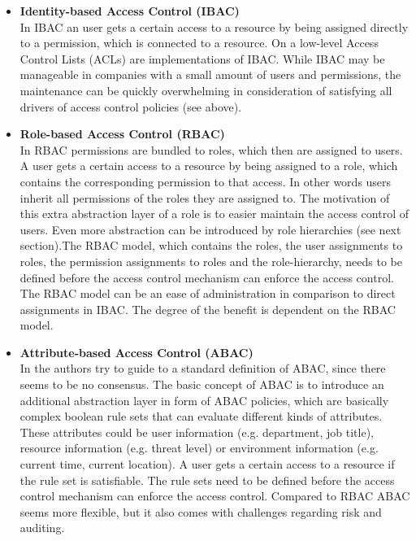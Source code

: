         \iffalse There is no consensus on the terms access control models, mechanisms and techniques. In this thesis an access control policy model describes a policy framework that specifies how permissions are managed and who, under what circumstances, is entitled to which permission on a high-level. There are different Access Control Policy Models which come with different advantages and disadvantages. Some of these models are briefly described in the following to enable the reader to differentiate between the concepts. \fi
        \begin{itemize}
            \iffalse \item \textbf{Discretionary Access Control (DAC)}\\\fi
            \item \textbf{Identity-based Access Control (IBAC)}\\
            In IBAC an user gets a certain access to a resource by being assigned directly to a permission, which is connected to a resource. On a low-level Access Control Lists (ACLs) are implementations of IBAC. While IBAC may be manageable in companies with a small amount of users and permissions, the maintenance can be quickly overwhelming in consideration of satisfying all drivers of access control policies (see above).
            \item \textbf{Role-based Access Control (RBAC)}\\
            In RBAC permissions are bundled to roles, which then are assigned to users. A user gets a certain access to a resource by being assigned to a role, which contains the corresponding permission to that access. In other words users inherit all permissions of the roles they are assigned to. The motivation of this extra abstraction layer of a role is to easier maintain the access control of users.
            Even more abstraction can be introduced by role hierarchies (see next section).\iffalse , where a role inherits all permissions of its parent-role.\fi The RBAC model, which contains the roles, the user assignments to roles, the permission assignments to roles and the role-hierarchy, needs to be defined before the access control mechanism can enforce the access control. The RBAC model can be an ease of administration in comparison to direct assignments in IBAC. The degree of the benefit is dependent on the RBAC model.
            \item \textbf{Attribute-based Access Control (ABAC)}\\
            In \cite{Hu13guideto} the authors try to guide to a standard definition of ABAC, since there seems to be no consensus. The basic concept of ABAC is to introduce an additional abstraction layer in form of ABAC policies, which are basically complex boolean rule sets that can evaluate different kinds of attributes. These attributes could be user information (e.g. department, job title), resource information (e.g. threat level) or environment information (e.g. current time, current location). A user gets a certain access to a resource if the rule set is satisfiable. The rule sets need to be defined before the access control mechanism can enforce the access control. Compared to RBAC ABAC seems more flexible, but it also comes with challenges regarding risk and auditing\cite{Coyne:2013}.

\end{itemize}
